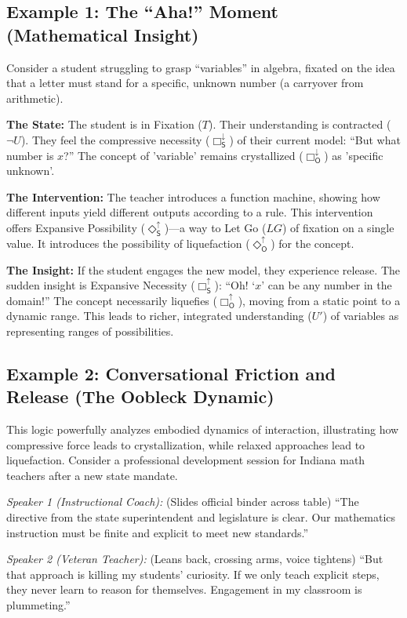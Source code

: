 \documentclass[12pt]{book}
\newcommand{\SBoxUp}{\Box_{\mathsf{S}}^{\uparrow}}
\newcommand{\SBoxDown}{\Box_{\mathsf{S}}^{\downarrow}}
\newcommand{\SDiaUp}{\Diamond_{\mathsf{S}}^{\uparrow}}
\newcommand{\OBoxUp}{\Box_{\mathsf{O}}^{\uparrow}}
\newcommand{\OBoxDown}{\Box_{\mathsf{O}}^{\downarrow}}
\newcommand{\ODiaUp}{\Diamond_{\mathsf{O}}^{\uparrow}}
\begin{document}
\subsection{Example 1: The ``Aha!'' Moment (Mathematical Insight)}

Consider a student struggling to grasp ``variables'' in algebra, fixated on the idea that a letter must stand for a specific, unknown number (a carryover from arithmetic).

\textbf{The State:} The student is in Fixation ($T$). Their understanding is contracted ($\neg U$). They feel the compressive necessity ($\SBoxDown$) of their current model: ``But what number is $x$?'' The concept of 'variable' remains crystallized ($\OBoxDown$) as 'specific unknown'.

\textbf{The Intervention:} The teacher introduces a function machine, showing how different inputs yield different outputs according to a rule. This intervention offers Expansive Possibility ($\SDiaUp$)---a way to Let Go ($LG$) of fixation on a single value. It introduces the possibility of liquefaction ($\ODiaUp$) for the concept.

\textbf{The Insight:} If the student engages the new model, they experience release. The sudden insight is Expansive Necessity ($\SBoxUp$): ``Oh! `$x$' can be any number in the domain!'' The concept necessarily liquefies ($\OBoxUp$), moving from a static point to a dynamic range. This leads to richer, integrated understanding ($U'$) of variables as representing ranges of possibilities.

\subsection{Example 2: Conversational Friction and Release (The Oobleck Dynamic)}

This logic powerfully analyzes embodied dynamics of interaction, illustrating how compressive force leads to crystallization, while relaxed approaches lead to liquefaction. Consider a professional development session for Indiana math teachers after a new state mandate.

\textit{Speaker 1 (Instructional Coach):} (Slides official binder across table) ``The directive from the state superintendent and legislature is clear. Our mathematics instruction must be finite and explicit to meet new standards.''

\textit{Speaker 2 (Veteran Teacher):} (Leans back, crossing arms, voice tightens) ``But that approach is killing my students' curiosity. If we only teach explicit steps, they never learn to reason for themselves. Engagement in my classroom is plummeting.''
\end{document}
